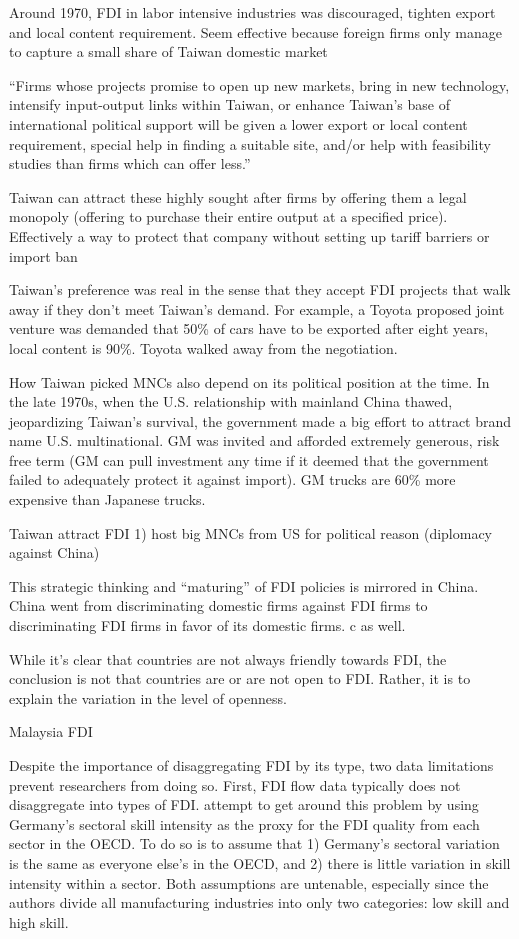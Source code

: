 Around 1970, FDI in labor intensive industries was discouraged, tighten export
and local content requirement. Seem effective because foreign firms only manage
to capture a small share of Taiwan domestic market

``Firms whose projects promise to open up new markets, bring in new technology,
intensify input-output links within Taiwan, or enhance Taiwan's base of
international political support will be given a lower export or local content
requirement, special help in finding a suitable site, and/or help with
feasibility studies than firms which can offer less.''

Taiwan can attract these highly sought after firms by offering them a legal
monopoly (offering to purchase their entire output at a specified price).
Effectively a way to protect that company without setting up tariff barriers or
import ban

Taiwan's preference was real in the sense that they accept FDI projects that
walk away if they don't meet Taiwan's demand. For example, a Toyota proposed
joint venture was demanded that 50\% of cars have to be exported after eight
years, local content is 90\%. Toyota walked away from the negotiation.

How Taiwan picked MNCs also depend on its political position at the time. In the
late 1970s, when the U.S. relationship with mainland China thawed, jeopardizing
Taiwan's survival, the government made a big effort to attract brand name U.S.
multinational. GM was invited and afforded extremely generous, risk free term
(GM can pull investment any time if it deemed that the government failed to
adequately protect it against import). GM trucks are 60\% more expensive than
Japanese trucks. \citep{Noble1987}

Taiwan attract FDI 1) host big MNCs from US for political reason (diplomacy
against China)

This strategic thinking and ``maturing'' of FDI policies is mirrored in China.
China went from discriminating domestic firms against FDI firms to
discriminating FDI firms in favor of its domestic firms. c as well.

While it's clear that countries are not always friendly towards FDI, the
conclusion is not that countries are or are not open to FDI. Rather, it is to
explain the variation in the level of openness.


Malaysia FDI \citep{Athukorala1995}

Despite the importance of disaggregating FDI by its type, two data limitations
prevent researchers from doing so. First, FDI flow data typically does not
disaggregate into types of FDI. \citet{Alfaro2007} attempt to get around this
problem by using Germany's sectoral skill intensity as the proxy for the FDI
quality from each sector in the OECD. To do so is to assume that 1) Germany's
sectoral variation is the same as everyone else's in the OECD, and 2) there is
little variation in skill intensity within a sector. Both assumptions are
untenable, especially since the authors divide all manufacturing industries into
only two categories: low skill and high skill.

